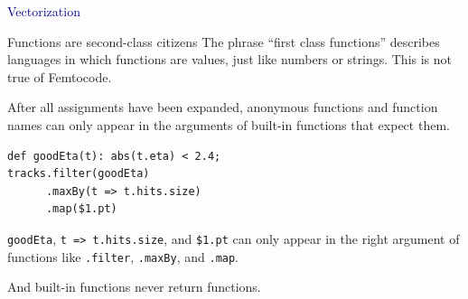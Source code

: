 \documentclass{beamer}
\begin{document}

\begin{frame}{}
\begin{center}
\textcolor{darkblue}{\huge Vectorization}
\end{center}
\end{frame}

\begin{frame}[fragile]{Functions are second-class citizens}
\vspace{0.5 cm}
The phrase ``first class functions'' describes languages in which functions are values, just like numbers or strings. This is not true of Femtocode.

\vspace{0.5 cm}
After all assignments have been expanded, anonymous functions and function names can only appear in the arguments of built-in functions that expect them.

\begin{center}
\begin{minipage}{0.9\linewidth}
\small
\begin{verbatim}
def goodEta(t): abs(t.eta) < 2.4;
tracks.filter(goodEta)
      .maxBy(t => t.hits.size)
      .map($1.pt)
\end{verbatim}
\end{minipage}
\end{center}

{\tt goodEta}, {\tt t => t.hits.size}, and {\tt \$1.pt} can only appear in the right argument of functions like {\tt .filter}, {\tt .maxBy}, and {\tt .map}.

\vspace{0.5 cm}
And built-in functions never return functions.
\end{frame}
\end{document}
